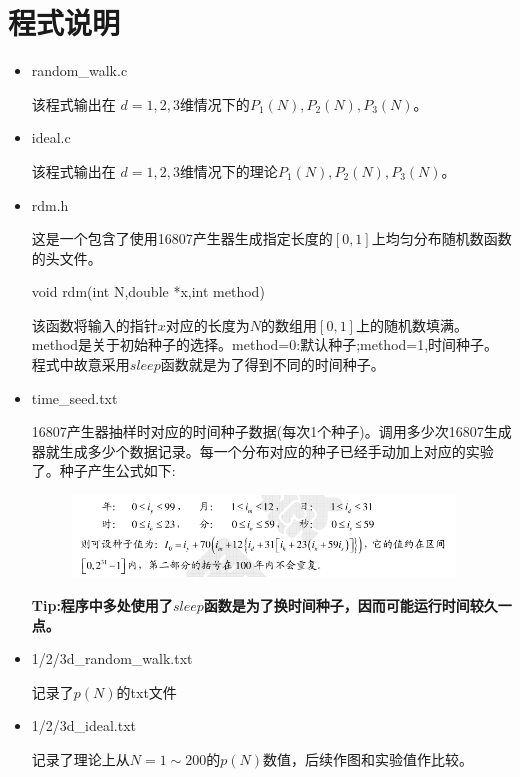 \documentclass[UTF8]{ctexart}
\begin{document}
	\section{程式说明}
	
	
	\begin{itemize}
		\item random\_walk.c
		
		该程式输出在 $d=1,2,3$维情况下的$P_1(N),P_2(N),P_3(N)$。
		
		\item ideal.c
		
		该程式输出在 $d=1,2,3$维情况下的理论$P_1(N),P_2(N),P_3(N)$。
		
		\item rdm.h
			
		这是一个包含了使用16807产生器生成指定长度的$[0,1]$上均匀分布随机数函数的头文件。
		
		\subitem void rdm(int N,double *x,int method)
		
		该函数将输入的指针$x$对应的长度为$N$的数组用$[0,1]$上的随机数填满。method是关于初始种子的选择。method=0:默认种子;method=1,时间种子。程式中故意采用$sleep$函数就是为了得到不同的时间种子。
		
		\item time\_seed.txt
		
		16807产生器抽样时对应的时间种子数据(每次1个种子)。调用多少次16807生成器就生成多少个数据记录。每一个分布对应的种子已经手动加上对应的实验了。种子产生公式如下:
		
%		
		\begin{figure}[H]
			\centering  %
			\includegraphics[width=4in]{1.png}
		\end{figure}
%		
\textbf{		Tip:程序中多处使用了$sleep$函数是为了换时间种子，因而可能运行时间较久一点。}
	
		\item 1/2/3d\_random\_walk.txt
		
		记录了$p(N)$的txt文件
		
		\item 1/2/3d\_ideal.txt
		
		记录了理论上从$N=1\sim200$的$p(N)$数值，后续作图和实验值作比较。
		
		
	\end{itemize}
	
\end{document}
